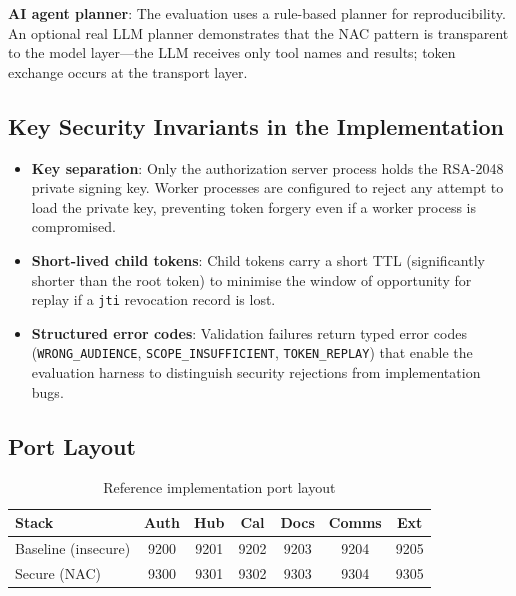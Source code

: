 \documentclass[journal]{IEEEtran}
\begin{document}
\textbf{AI agent planner}: The evaluation uses a rule-based planner for
reproducibility. An optional real LLM planner demonstrates that the NAC
pattern is transparent to the model layer---the LLM receives only tool names
and results; token exchange occurs at the transport layer.

\subsection{Key Security Invariants in the Implementation}

\begin{itemize}
  \item \textbf{Key separation}: Only the authorization server process holds the
        RSA-2048 private signing key. Worker processes are configured to reject
        any attempt to load the private key, preventing token forgery even if a
        worker process is compromised.
  \item \textbf{Short-lived child tokens}: Child tokens carry a short TTL
        (significantly shorter than the root token) to minimise the window of
        opportunity for replay if a \texttt{jti} revocation record is lost.
  \item \textbf{Structured error codes}: Validation failures return typed error
        codes (\texttt{WRONG\_AUDIENCE}, \texttt{SCOPE\_INSUFFICIENT},
        \texttt{TOKEN\_REPLAY}) that enable the evaluation harness to
        distinguish security rejections from implementation bugs.
\end{itemize}

\subsection{Port Layout}

\begin{table}[h]
\caption{Reference implementation port layout}
\label{tab:ports}
\centering
\footnotesize
\begin{tabular}{lcccccc}
\toprule
\textbf{Stack} & \textbf{Auth} & \textbf{Hub} & \textbf{Cal} & \textbf{Docs}
               & \textbf{Comms} & \textbf{Ext} \\
\midrule
Baseline (insecure) & 9200 & 9201 & 9202 & 9203 & 9204 & 9205 \\
Secure (NAC)        & 9300 & 9301 & 9302 & 9303 & 9304 & 9305 \\
\bottomrule
\end{tabular}
\end{table}
\end{document}
